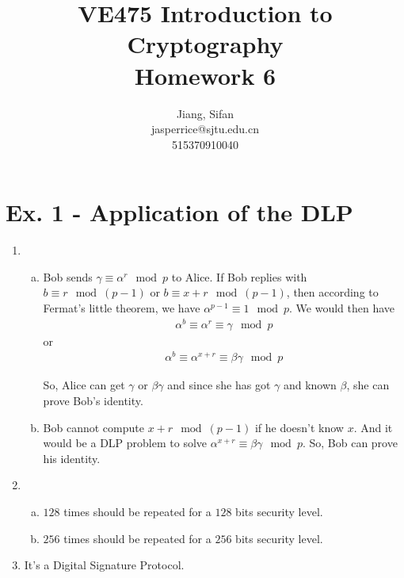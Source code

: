 \documentclass[11pt,a4paper]{article}
\title{
	VE475 Introduction to Cryptography \\
	Homework 6
}
\author{
	Jiang, Sifan\\
	jasperrice@sjtu.edu.cn\\
	515370910040
}
\begin{document}
\maketitle
\section*{Ex. 1 - Application of the DLP}
\begin{enumerate}
\item \begin{enumerate}[a)]
\item Bob sends $\gamma \equiv \alpha^{r} \mod p$ to Alice. If Bob replies with $b \equiv r \mod (p-1)$ or $b \equiv x + r \mod (p-1)$, then according to Fermat's little theorem, we have $\alpha^{p-1} \equiv 1 \mod p$. We would then have
\begin{align*}
	\alpha^{b} \equiv \alpha^{r} \equiv \gamma \mod p
\end{align*}
or
\begin{align*}
	\alpha^{b} \equiv \alpha^{x+r} \equiv \beta\gamma \mod p
\end{align*}
\par So, Alice can get $\gamma$ or $\beta\gamma$  and since she has got $\gamma$ and known $\beta$, she can prove Bob's identity.

\item Bob cannot compute $x+r \mod (p-1)$ if he doesn't know $x$. And it would be a DLP problem to solve $\alpha^{x + r} \equiv \beta\gamma \mod p$. So, Bob can prove his identity.
\end{enumerate}

\item \begin{enumerate}[a)]
\item $128$ times should be repeated for a $128$ bits security level.

\item $256$ times should be repeated for a $256$ bits security level.
\end{enumerate}

\item It's a Digital Signature Protocol.
\end{enumerate}
\end{document}
